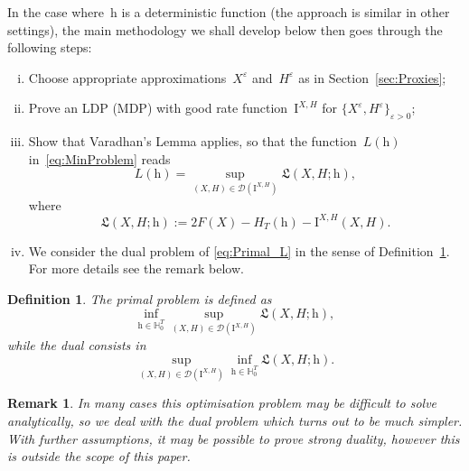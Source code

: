 \documentclass{amsart}[11pt]
\numberwithin{equation}{section}
\numberwithin{theorem}{subsection}
\numberwithin{proposition}{subsection}
\newtheorem{definition}{Definition}
\numberwithin{definition}{subsection}
\numberwithin{lemma}{subsection}
\newtheorem*{remark}{Remark}
\numberwithin{assumption}{subsection}
\newcommand{\Dd}{\mathcal{D}}
\newcommand{\HH}{\mathbb{H}}
\newcommand{\Lf}{\mathfrak{L}}
\newcommand{\II}{\mathrm{I}}
\newcommand{\eps}{\varepsilon}
\newcommand{\hh}{\boldsymbol{\mathrm{h}}}
\begin{document}
In the case where~$\hh$ is a deterministic function 
(the approach is similar in other settings), 
the main methodology we shall develop below then goes through the following steps:

\begin{enumerate}[i)]
    \item Choose appropriate approximations~$X^{\eps}$ and~$H^{\eps}$ as in Section~\ref{sec:Proxies};
    \item Prove an LDP (MDP) with good rate function~$\II^{X,H}$ for $\{X^\eps,H^{\eps}\}_{\eps>0}$;
    \item Show that Varadhan's Lemma applies, 
    so that the function~$L(\hh)$ in~\eqref{eq:MinProblem} reads
    \begin{equation}\label{eq:Primal_L}
    L(\hh) = \sup_{(X,H)\in \Dd(\II^{X,H})} \Lf(X,H;\hh),
    \end{equation}
    where
\begin{equation}\label{eq:TargetFunc}
\Lf(X,H;\hh) := 2F(X) - H_T(\hh) - \II^{X,H}(X,H).
    \end{equation}
    \item We consider the dual problem of \eqref{eq:Primal_L} in the sense of Definition~\ref{def:Dual_L}. For more details see the remark below.
\end{enumerate}

\begin{definition}\label{def:Dual_L}
The primal problem is defined as
\begin{equation}\label{eq:Primal}
\inf_{\hh\in\HH^T_0} \sup_{(X,H)\in \Dd(\II^{X,H})}\Lf(X,H;\hh),
\end{equation}
while the dual consists in
\begin{equation}\label{eq:Dual}
\sup_{(X,H)\in \Dd(\II^{X,H})} \inf_{\hh\in\HH^T_0} \Lf(X,H;\hh).
\end{equation}
\end{definition}

\begin{remark}
In many cases this optimisation problem may be difficult to solve analytically, so we deal with the dual problem which turns out to be much simpler.
With further assumptions, it may be possible to prove strong duality, however this is outside the scope of this paper.
\end{remark}
\end{document}
